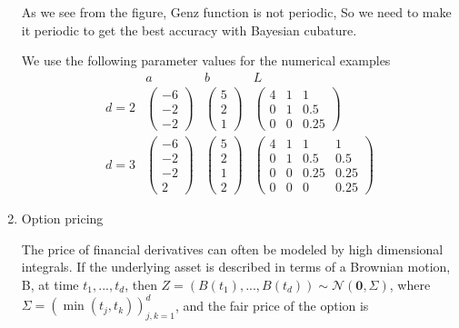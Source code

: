 \documentclass[twocolumn]{svjour3}          %
\newcommand{\bm}[1]{\boldsymbol{#1}}
\newcommand{\mSigma}{\Sigma}
\newcommand{\vzero}{\bm{0}}
\newcommand{\calN}{\mathcal{N}}
\begin{document}
\begin{enumerate}
As we see from the figure, Genz function is not periodic, So we need to make it periodic to get the best accuracy with Bayesian cubature.


We use the following parameter values for the numerical examples
\begin{equation*}
\begin{array}{c|ccc}
 & a  & b & L  \\
\hline
d=2 
 & 
\begin{pmatrix}
-6 \\ -2 \\ -2
\end{pmatrix}
 & 
\begin{pmatrix}
5 \\ 2 \\ 1
\end{pmatrix} 
 & 
\begin{pmatrix}
4 & 1 & 1 \\ 0 & 1 & 0.5 \\ 0 & 0 & 0.25
\end{pmatrix} 
\\
d=3
 & 
\begin{pmatrix}
-6 \\ -2 \\ -2 \\ 2
\end{pmatrix}
 & 
\begin{pmatrix}
5 \\ 2 \\ 1 \\2
\end{pmatrix} 
 & 
\begin{pmatrix}
4 & 1 & 1 & 1\\ 0 & 1 & 0.5 & 0.5 \\ 0 & 0 & 0.25 & 0.25 \\ 0 & 0 & 0 & 0.25
\end{pmatrix} 
\end{array}
\end{equation*}








\item Option pricing


The price of financial derivatives can often be modeled by high dimensional integrals. If the underlying asset is described in terms of a Brownian motion, B, at time $t_1,...,t_d$, then $Z = (B(t_1), ..., B(t_d)) \sim \calN(\vzero,\mSigma)$, where $\mSigma = \left(\min(t_j,t_k) \right)_{j,k=1}^d$, and the fair price of the option is


\end{enumerate}
\end{document}
